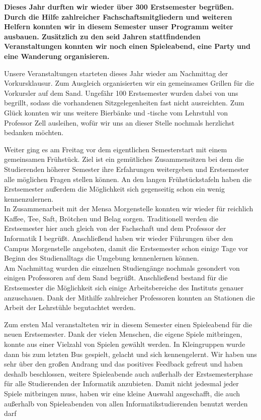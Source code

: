 \textbf{Dieses Jahr durften wir wieder über 300 Erstsemester begrüßen. Durch die Hilfe zahlreicher Fachschaftsmitgliedern und weiteren Helfern konnten wir in diesem Semester unser Programm weiter ausbauen. Zusätzlich zu den seid Jahren stattfindenden Veranstaltungen konnten wir noch einen Spieleabend, eine Party und eine Wanderung organisieren.}
%

Unsere Veranstaltungen starteten dieses Jahr wieder am Nachmittag der Vorkursklausur. Zum Ausgleich organisierten wir ein gemeinsames Grillen für die Vorkursler auf dem Sand. Ungefähr 100 Erstsemester wurden dabei von uns begrillt, sodass die vorhandenen Sitzgelegenheiten fast nicht ausreichten. Zum Glück konnten wir uns weitere Bierbänke und -tische vom Lehrstuhl von Professor Zell ausleihen, wofür wir uns an dieser Stelle nochmals herzlichst bedanken möchten.

Weiter ging es am Freitag vor dem eigentlichen Semesterstart mit einem gemeinsamen Frühstück. Ziel ist ein gemütliches Zusammensitzen bei dem die Studierenden höherer Semester ihre Erfahrungen weitergeben und Erstsemester alle möglichen Fragen stellen können. An den langen Frühstückstafeln haben die Erstsemester außerdem die Möglichkeit sich gegenseitig schon ein wenig kennenzulernen.\\
In Zusammenarbeit mit der Mensa Morgenstelle konnten wir wieder für reichlich Kaffee, Tee, Saft, Brötchen und Belag sorgen. Traditionell werden die Erstsemester hier auch gleich von der Fachschaft und dem Professor der Informatik I begrüßt. Anschließend haben wir wieder Führungen über den Campus Morgenstelle angeboten, damit die Erstsemester schon einige Tage vor Beginn des Studienalltags die Umgebung kennenlernen können.\\
Am Nachmittag wurden die einzelnen Studiengänge nochmals gesondert von einigen Professoren auf dem Sand begrüßt. Anschließend bestand für die Erstsemester die Möglichkeit sich einige Arbeitsbereiche des Instituts genauer anzuschauen. Dank der Mithilfe zahlreicher Professoren konnten an  Stationen die Arbeit der Lehrstühle begutachtet werden.
%
%
%

Zum ersten Mal veranstalteten wir in diesem Semester einen Spieleabend für die neuen Erstsemester. Dank der vielen Menschen, die eigene Spiele mitbringen, konnte aus einer Vielzahl von Spielen gewählt werden. In Kleingruppen wurde dann bis zum letzten Bus gespielt, gelacht und sich kennengelernt. Wir haben uns sehr über den großen Andrang und das positives Feedback gefreut und haben deshalb beschlossen, weitere Spieleabende auch außerhalb der Erstsemesterphase für alle Studierenden der Informatik anzubieten. Damit nicht jedesmal jeder Spiele mitbringen muss, haben wir eine kleine Auswahl angeschafft, die auch außerhalb von Spieleabenden von allen Informatikstudierenden benutzt werden darf

